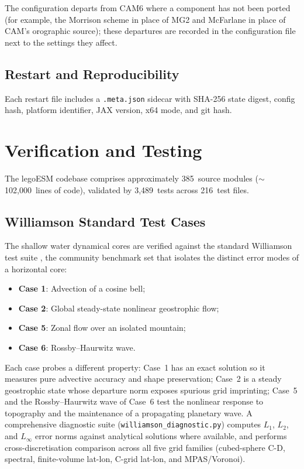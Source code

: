 \documentclass[11pt,twoside]{report}
\begin{document}
The configuration departs from
CAM6 where a component has not been ported (for example, the Morrison scheme
in place of MG2 and McFarlane in place of CAM's orographic source); these
departures are recorded in the configuration file next to the settings they
affect.

\section{Restart and Reproducibility}

Each restart file includes a \texttt{.meta.json} sidecar with SHA-256
state digest, config hash, platform identifier, JAX version, x64 mode,
and git hash.


\chapter{Verification and Testing}
\label{ch:verification}

The legoESM codebase comprises approximately 385~source modules
($\sim$102{,}000~lines of code), validated by 3{,}489~tests across
216~test files.

\section{Williamson Standard Test Cases}
\label{sec:williamson}

The shallow water dynamical cores are verified against the standard
Williamson test suite \citep{Williamson1992}, the community benchmark set that
isolates the distinct error modes of a horizontal core:
\begin{itemize}[nosep]
  \item \textbf{Case 1}: Advection of a cosine bell;
  \item \textbf{Case 2}: Global steady-state nonlinear geostrophic flow;
  \item \textbf{Case 5}: Zonal flow over an isolated mountain;
  \item \textbf{Case 6}: Rossby--Haurwitz wave.
\end{itemize}
Each case probes a different property: Case~1 has an exact solution so it
measures pure advective accuracy and shape preservation; Case~2 is a steady
geostrophic state whose departure norm exposes spurious grid imprinting; Case~5
and the Rossby--Haurwitz wave of Case~6 test the nonlinear response to
topography and the maintenance of a propagating planetary wave.
A comprehensive diagnostic suite (\texttt{williamson\_diagnostic.py})
computes $L_1$, $L_2$, and $L_\infty$ error norms against analytical
solutions where available, and performs cross-discretisation comparison
across all five grid families (cubed-sphere C-D, spectral, finite-volume
lat-lon, C-grid lat-lon, and MPAS/Voronoi).
\end{document}
